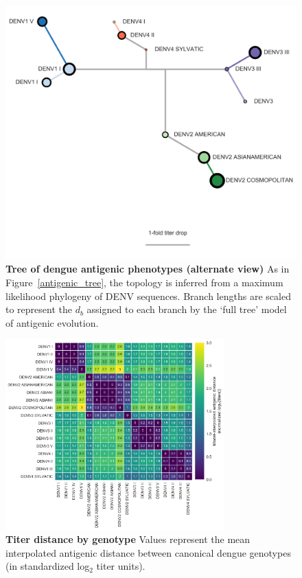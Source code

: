 \documentclass[11pt,oneside,letterpaper]{article}
\begin{document}
\begin{figure}[h]
  \centering
  \includegraphics[width=\textwidth]{../figures/png/antigenic_tree_supplement.png}
  \caption{\textbf{Tree of dengue antigenic phenotypes (alternate view)}
As in Figure~\ref{antigenic_tree}, the topology is inferred from a maximum likelihood phylogeny of DENV sequences.
Branch lengths are scaled to represent the $d_b$ assigned to each branch by the `full tree' model of antigenic evolution.
  }
\label{antigenic_tree_supplement}
\end{figure}

\begin{figure}[h]
\centering
	\includegraphics[width=0.75\textwidth]{../figures/png/genotype_dTiter_heatmap.png}
	\caption{\textbf{Titer distance by genotype}
  Values represent the mean interpolated antigenic distance between canonical dengue genotypes (in standardized log$_2$ titer units).
  }
	\label{genotype_dTiter_heatmap}
\end{figure}
\end{document}
